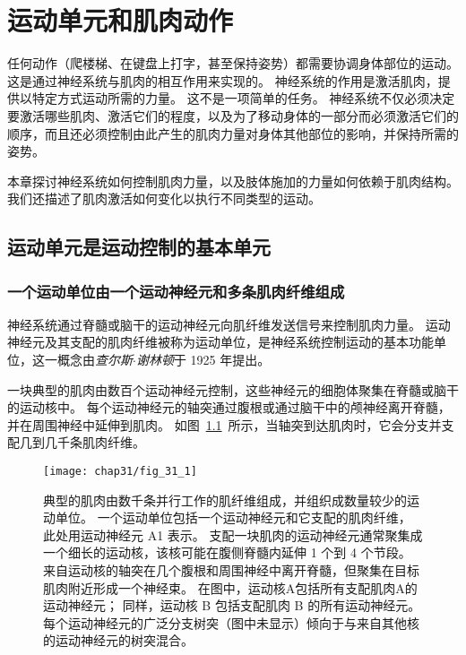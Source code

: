 \chapter{运动单元和肌肉动作} \label{chap:chap31}

任何动作（爬楼梯、在键盘上打字，甚至保持姿势）都需要协调身体部位的运动。
这是通过神经系统与肌肉的相互作用来实现的。
神经系统的作用是激活肌肉，提供以特定方式运动所需的力量。
这不是一项简单的任务。
神经系统不仅必须决定要激活哪些肌肉、激活它们的程度，以及为了移动身体的一部分而必须激活它们的顺序，而且还必须控制由此产生的肌肉力量对身体其他部位的影响，并保持所需的姿势。


本章探讨神经系统如何控制肌肉力量，以及肢体施加的力量如何依赖于肌肉结构。
我们还描述了肌肉激活如何变化以执行不同类型的运动。



\section{运动单元是运动控制的基本单元}

\subsection{一个运动单位由一个运动神经元和多条肌肉纤维组成}

神经系统通过脊髓或脑干的运动神经元向肌纤维发送信号来控制肌肉力量。
运动神经元及其支配的肌肉纤维被称为运动单位，是神经系统控制运动的基本功能单位，这一概念由\textit{查尔斯$\cdot$谢林顿}于 1925 年提出。


一块典型的肌肉由数百个运动神经元控制，这些神经元的细胞体聚集在脊髓或脑干的运动核中。
每个运动神经元的轴突通过腹根或通过脑干中的颅神经离开脊髓，并在周围神经中延伸到肌肉。
如图~\ref{fig:31_1}~所示，当轴突到达肌肉时，它会分支并支配几到几千条肌肉纤维。


\begin{figure}[htbp]
	\centering
	\texttt{[image: chap31/fig\_31\_1]}
	\caption{典型的肌肉由数千条并行工作的肌纤维组成，并组织成数量较少的运动单位。
		一个运动单位包括一个运动神经元和它支配的肌肉纤维，此处用运动神经元 A1 表示。
		支配一块肌肉的运动神经元通常聚集成一个细长的运动核，该核可能在腹侧脊髓内延伸 1 个到 4 个节段。
		来自运动核的轴突在几个腹根和周围神经中离开脊髓，但聚集在目标肌肉附近形成一个神经束。
		在图中，运动核A包括所有支配肌肉A的运动神经元；
		同样，运动核 B 包括支配肌肉 B 的所有运动神经元。
		每个运动神经元的广泛分支树突（图中未显示）倾向于与来自其他核的运动神经元的树突混合。}
	\label{fig:31_1}
\end{figure}


